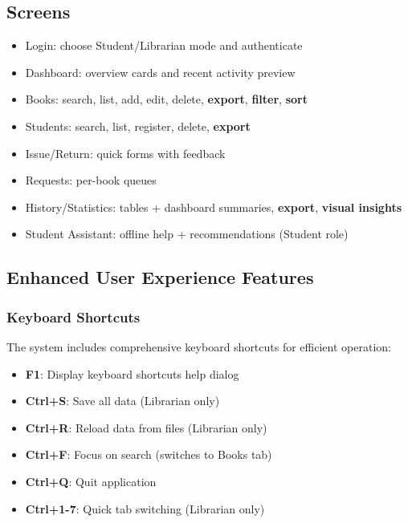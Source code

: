 \documentclass[11pt,a4paper]{article}
\begin{document}
\subsection{Screens}
\begin{itemize}
  \item Login: choose Student/Librarian mode and authenticate
  \item Dashboard: overview cards and recent activity preview
  \item Books: search, list, add, edit, delete, \textbf{export}, \textbf{filter}, \textbf{sort}
  \item Students: search, list, register, delete, \textbf{export}
  \item Issue/Return: quick forms with feedback
  \item Requests: per-book queues
  \item History/Statistics: tables + dashboard summaries, \textbf{export}, \textbf{visual insights}
  \item Student Assistant: offline help + recommendations (Student role)
\end{itemize}

\subsection{Enhanced User Experience Features}

\subsubsection{Keyboard Shortcuts}
The system includes comprehensive keyboard shortcuts for efficient operation:
\begin{itemize}
  \item \textbf{F1}: Display keyboard shortcuts help dialog
  \item \textbf{Ctrl+S}: Save all data (Librarian only)
  \item \textbf{Ctrl+R}: Reload data from files (Librarian only)
  \item \textbf{Ctrl+F}: Focus on search (switches to Books tab)
  \item \textbf{Ctrl+Q}: Quit application
  \item \textbf{Ctrl+1-7}: Quick tab switching (Librarian only)
\end{itemize}
\end{document}
